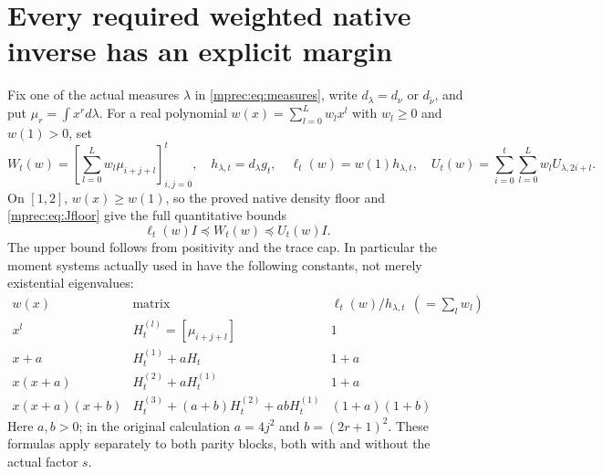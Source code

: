 \section{Every required weighted native inverse has an explicit margin}

Fix one of the actual measures $\lambda$ in \eqref{mprec:eq:measures},
write $d_\lambda=d_\nu$ or $d_{\widetilde\nu}$, and put
$\mu_r=\int x^r d\lambda$. For a real polynomial
$w(x)=\sum_{l=0}^Lw_lx^l$ with $w_l\ge0$ and $w(1)>0$, set
\begin{equation}\label{mprec:eq:W}
 W_t(w)=\left[\sum_{l=0}^Lw_l\mu_{i+j+l}\right]_{i,j=0}^t,
 \quad h_{\lambda,t}=d_\lambda g_t,
 \quad \ell_t(w)=w(1)h_{\lambda,t},\quad
 U_t(w)=\sum_{i=0}^t\sum_{l=0}^Lw_lU_{\lambda,2i+l}.
\end{equation}
On $[1,2]$, $w(x)\ge w(1)$, so the proved native density floor
and \eqref{mprec:eq:Jfloor} give the full quantitative bounds
\begin{equation}\label{mprec:eq:Wfloor}
 \boxed{\ell_t(w)I\preceq W_t(w)\preceq U_t(w)I.}
\end{equation}
The upper bound follows from positivity and the trace cap. In
particular the moment systems actually used in \cite{mprec:FM} have
the following constants, not merely existential eigenvalues:
\[
\begin{array}{c|c|c}
 w(x)&\text{matrix}&\ell_t(w)/h_{\lambda,t}\ \ (=\sum_lw_l)\\ \hline
 x^l&H_t^{(l)}=[\mu_{i+j+l}]&1\\
 x+a&H_t^{(1)}+aH_t&1+a\\
 x(x+a)&H_t^{(2)}+aH_t^{(1)}&1+a\\
 x(x+a)(x+b)&H_t^{(3)}+(a+b)H_t^{(2)}+abH_t^{(1)}&(1+a)(1+b)
\end{array}
\]
Here $a,b>0$; in the original calculation $a=4j^2$ and
$b=(2r+1)^2$. These formulas apply separately to both parity
blocks, both with and without the actual factor $s$.

